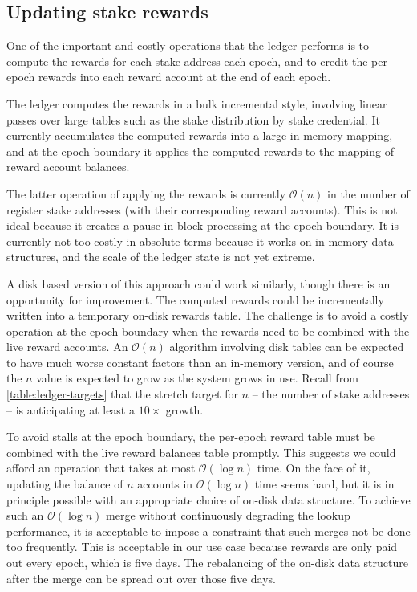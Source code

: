 \documentclass[11pt,a4paper]{article}
\begin{document}
\subsection{Updating stake rewards}
\label{sec:updating-stake-rewards}

One of the important and costly operations that the ledger performs is to
compute the rewards for each stake address each epoch, and to credit the
per-epoch rewards into each reward account at the end of each epoch.

The ledger computes the rewards in a bulk incremental style, involving linear
passes over large tables such as the stake distribution by stake credential. It
currently accumulates the computed rewards into a large in-memory mapping, and
at the epoch boundary it applies the computed rewards to the mapping of reward
account balances.

The latter operation of applying the rewards is currently $\mathcal{O}(n)$
in the number of register stake addresses (with their corresponding reward
accounts). This is not ideal because it creates a pause in block processing at
the epoch boundary. It is currently not too costly in absolute terms because
it works on in-memory data structures, and the scale of the ledger state is not
yet extreme.

A disk based version of this approach could work similarly, though there is an
opportunity for improvement. The computed rewards could be incrementally
written into a temporary on-disk rewards table. The challenge is to avoid a
costly operation at the epoch boundary when the rewards need to be combined
with the live reward accounts. An $\mathcal{O}(n)$ algorithm involving disk
tables can be expected to have much worse constant factors than an in-memory
version, and of course the $n$ value is expected to grow as the system grows
in use. Recall from \cref{table:ledger-targets} that the stretch target for
$n$ -- the number of stake addresses -- is anticipating at least a $10\times$
growth.

To avoid stalls at the epoch boundary, the per-epoch reward table must be
combined with the live reward balances table promptly. This suggests we could
afford an operation that takes at most $\mathcal{O}(\log n)$ time. On the face
of it, updating the balance of $n$ accounts in $\mathcal{O}(\log n)$ time seems
hard, but it is in principle possible with an appropriate choice of on-disk
data structure. To achieve such an $\mathcal{O}(\log n)$ merge without
continuously degrading the lookup performance, it is acceptable to impose a
constraint that such merges not be done too frequently. This is acceptable in
our use case because rewards are only paid out every epoch, which is five days.
The rebalancing of the on-disk data structure after the merge can be spread out
over those five days.
\end{document}
